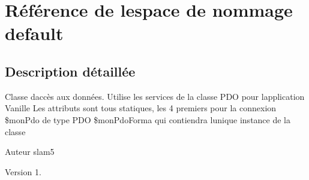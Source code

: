 \hypertarget{namespacedefault}{}\section{Référence de l\textquotesingle{}espace de nommage default}
\label{namespacedefault}


\subsection{Description détaillée}
Classe d\textquotesingle{}accès aux données. Utilise les services de la classe P\+DO pour l\textquotesingle{}application Vanille Les attributs sont tous statiques, les 4 premiers pour la connexion \$mon\+Pdo de type P\+DO \$mon\+Pdo\+Forma qui contiendra l\textquotesingle{}unique instance de la classe

\begin{DoxyAuthor}{Auteur}
slam5 
\end{DoxyAuthor}
\begin{DoxyVersion}{Version}
1. 
\end{DoxyVersion}
